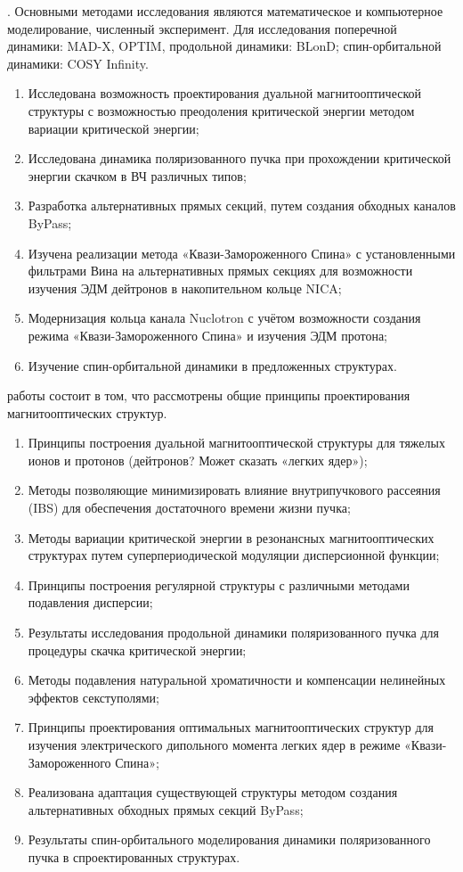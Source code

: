 {\methods}. Основными методами исследования являются математическое и компьютерное моделирование, численный эксперимент. Для исследования поперечной динамики: MAD-X, OPTIM, продольной динамики: BLonD; спин-орбитальной динамики: COSY Infinity.

{\novelty}
\begin{enumerate}[beginpenalty=10000] %
  \item	Исследована возможность проектирования дуальной магнитооптической структуры с возможностью преодоления критической энергии методом вариации критической энергии;
  \item	Исследована динамика поляризованного пучка при прохождении критической энергии скачком в ВЧ различных типов;
  \item	Разработка альтернативных прямых секций, путем создания обходных каналов ByPass;
  \item	Изучена реализации метода «Квази-Замороженного Спина» с установленными фильтрами Вина на альтернативных прямых секциях для возможности изучения ЭДМ дейтронов в накопительном кольце NICA;
  \item	Модернизация кольца канала Nuclotron с учётом возможности создания режима «Квази-Замороженного Спина» и изучения ЭДМ протона;
  \item	Изучение спин-орбитальной динамики в предложенных структурах.
\end{enumerate}

{\influence} работы состоит в том, что рассмотрены общие принципы проектирования магнитооптических структур.

{}
\begin{enumerate}[beginpenalty=10000] %
  \item Принципы построения дуальной магнитооптической структуры для тяжелых ионов и протонов (дейтронов? Может сказать «легких ядер»);
  \item	Методы позволяющие минимизировать влияние внутрипучкового рассеяния (IBS) для обеспечения достаточного времени жизни пучка;
  \item	Методы вариации критической энергии в резонансных магнитооптических структурах путем суперпериодической модуляции дисперсионной функции;
  \item	Принципы построения регулярной структуры с различными методами подавления дисперсии;
  \item	Результаты исследования продольной динамики поляризованного пучка для процедуры скачка критической энергии;
  \item	Методы подавления натуральной хроматичности и компенсации нелинейных эффектов секступолями;
  \item Принципы проектирования оптимальных магнитооптических структур для изучения электрического дипольного момента легких ядер в режиме «Квази-Замороженного Спина»;
  \item	Реализована адаптация существующей структуры методом создания альтернативных обходных прямых секций ByPass;
  \item	Результаты спин-орбитального моделирования динамики поляризованного пучка в спроектированных структурах.
\end{enumerate}

